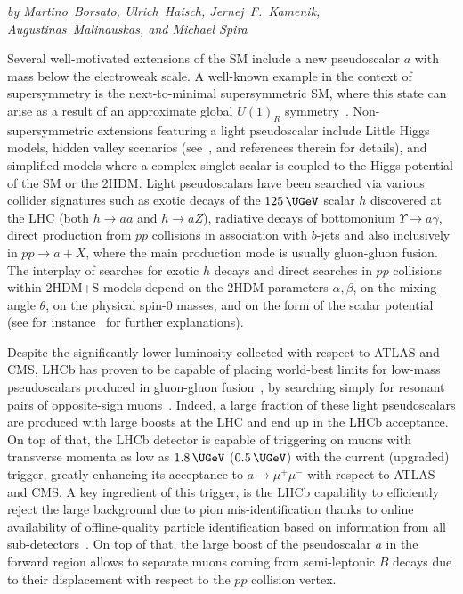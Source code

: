 \begin{center}
{\it by Martino~Borsato, Ulrich~Haisch, Jernej~F.~Kamenik, Augustinas~Malinauskas, and Michael Spira}
\end{center}

Several well-motivated extensions of the SM include a new pseudoscalar $a$ with mass below the electroweak scale. A well-known example in the context of supersymmetry is the next-to-minimal supersymmetric SM, where this state can arise as a result of an approximate global $U(1)_R$ symmetry~\cite{Dobrescu:2000yn}. Non-supersymmetric extensions featuring a light pseudoscalar include Little Higgs models, hidden valley scenarios (see~\cite{Curtin:2013fra}, and references therein for details), and simplified models where a complex singlet scalar is coupled to the Higgs potential of the SM or the 2HDM. Light pseudoscalars have been searched via various collider signatures such as exotic decays of the $125 \, {\rm \UGeV}$ scalar $h$ discovered at the LHC (both $h\to aa$ and $h\to aZ$), radiative decays of bottomonium $\Upsilon\to a\gamma$, direct production from $pp$ collisions in association with $b$-jets and also inclusively in $pp\to a+X$, where the main production mode is usually gluon-gluon fusion. The interplay of searches for exotic $h$ decays and direct searches in $pp$ collisions within 2HDM+S models depend on the 2HDM parameters $\alpha, \beta$, on the mixing angle $\theta$, on the physical spin-0 masses, and on the form of the scalar potential (see for instance~\cite{Haisch:2018kqx} for further explanations).

Despite the significantly lower luminosity collected with respect to ATLAS and CMS, LHCb has proven to be capable of placing world-best limits for low-mass pseudoscalars produced in gluon-gluon fusion~\cite{Haisch:2016hzu,Haisch:2018kqx}, by searching simply for resonant pairs of opposite-sign muons~\cite{Aaij:2017rft, Aaij:2018xpt}. Indeed, a large fraction of these light pseudoscalars are produced with large boosts at the LHC and end up in the LHCb acceptance. On top of that, the LHCb detector is capable of triggering on muons with transverse momenta as low as $1.8 \, {\rm \UGeV}$ ($0.5 \, {\rm \UGeV}$) with the current (upgraded) trigger, greatly enhancing its acceptance to $a\to\mu^+\mu^-$ with respect to ATLAS and CMS. A key ingredient of this trigger, is the LHCb capability to efficiently reject  the large background due to pion mis-identification thanks to online availability of offline-quality particle identification based on information from all sub-detectors~\cite{Aaij:2016rxn, Dujany:2015lxd}. On top of that, the large boost of the pseudoscalar $a$  in the forward region allows to separate muons coming from semi-leptonic $B$ decays due to their displacement with respect to the $pp$ collision vertex. 

